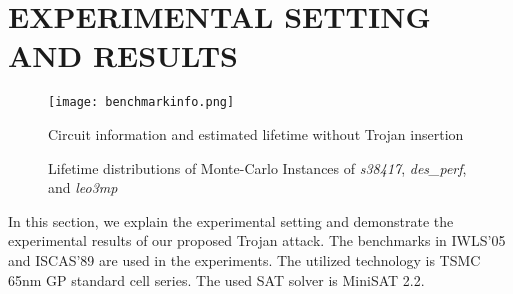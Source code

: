 \section{EXPERIMENTAL SETTING AND RESULTS}
\label{sec:mot}
\begin{figure*}
	\centering
	\texttt{[image: benchmarkinfo.png]}
	\caption{Circuit information and estimated lifetime without Trojan insertion}
	\label{fig:benchmark}
\end{figure*}

\begin{figure*}[!ht]
    \centering
    \hspace{0.1cm}
    \hspace{0.1cm}
    \hspace{0.1cm}
    \caption{Lifetime distributions of Monte-Carlo Instances of \textit{s38417}, \textit{des\_perf}, and \textit{leo3mp}}
    \label{fig:exp}
\end{figure*}


In this section, we explain the experimental setting and demonstrate the experimental results of our proposed Trojan attack. The benchmarks in IWLS'05 and ISCAS'89 are used in the experiments. The utilized technology is TSMC 65nm GP standard cell series. The used SAT solver is MiniSAT 2.2. %

